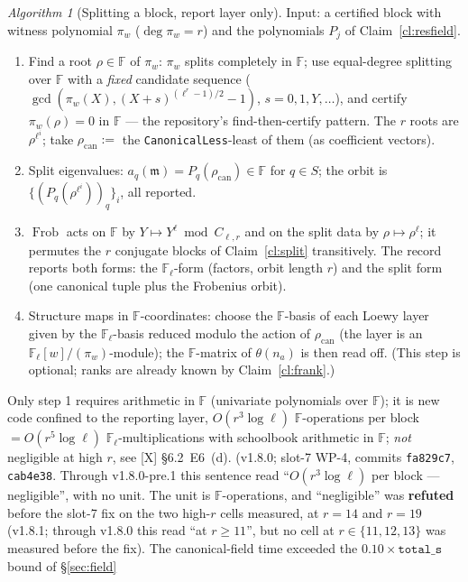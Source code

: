 \documentclass[11pt]{article}
\theoremstyle{remark}
\newtheorem{algorithm}[theorem]{Algorithm}
\newcommand{\F}{\mathbb{F}}
\newcommand{\Fl}{\F_\ell}
\DeclareMathOperator{\Frob}{Frob}
\newcommand{\m}{\mathfrak{m}}
\begin{document}
\begin{algorithm}[Splitting a block, report layer only]\label{alg:split}
Input: a certified block with witness polynomial $\pi_w$ ($\deg\pi_w=r$) and the polynomials
$P_j$ of Claim~\ref{cl:resfield}.
\begin{enumerate}
\item Find a root $\rho\in\F$ of $\pi_w$: $\pi_w$ splits completely in $\F$; use
  equal-degree splitting over $\F$ with a \emph{fixed} candidate sequence
  ($\gcd(\pi_w(X),(X+s)^{(\ell^r-1)/2}-1)$, $s=0,1,Y,\dots$), and certify $\pi_w(\rho)=0$ in $\F$
  --- the repository's find-then-certify pattern. The $r$ roots are $\rho^{\ell^i}$; take
  $\rho_{\mathrm{can}}:=$ the \texttt{CanonicalLess}-least of them (as coefficient vectors).
\item Split eigenvalues: $a_q(\m)=P_q(\rho_{\mathrm{can}})\in\F$ for $q\in S$; the orbit is
  $\{(P_q(\rho^{\ell^i}))_q\}_i$, all reported.
\item $\Frob$ acts on $\F$ by $Y\mapsto Y^\ell\bmod C_{\ell,r}$ and on the split data by
  $\rho\mapsto\rho^\ell$; it permutes the $r$ conjugate blocks of Claim~\ref{cl:split}
  transitively. The record reports both forms: the $\Fl$-form (factors, orbit length $r$) and
  the split form (one canonical tuple plus the Frobenius orbit).
\item Structure maps in $\F$-coordinates: choose the $\F$-basis of each Loewy layer given by
  the $\Fl$-basis reduced modulo the action of $\rho_{\mathrm{can}}$ (the layer is an
  $\Fl[w]/(\pi_w)$-module); the $\F$-matrix of $\theta(n_a)$ is then read off. (This step is
  optional; ranks are already known by Claim~\ref{cl:frank}.)
\end{enumerate}
\end{algorithm}
Only step 1 requires arithmetic in $\F$ (univariate polynomials over $\F$); it is new code
confined to the reporting layer, $O(r^3\log\ell)$ $\F$-operations per block $=O(r^5\log\ell)$
$\Fl$-multiplications with schoolbook arithmetic in $\F$; \emph{not} negligible at high $r$, see
[X] \S6.2~E6~(d). (v1.8.0; slot-7 WP-4, commits \texttt{fa829c7}, \texttt{cab4e38}. Through
v1.8.0-pre.1 this sentence read ``$O(r^3\log\ell)$ per block --- negligible'', with no unit. The
unit is $\F$-operations, and ``negligible'' was \textbf{refuted} before the slot-7 fix on the two
high-$r$ cells measured, at $r=14$ and $r=19$ (v1.8.1; through v1.8.0 this read ``at $r\ge11$'',
but no cell at $r\in\{11,12,13\}$ was measured before the fix). The canonical-field time exceeded
the $0.10\times\texttt{total\_s}$ bound of \S\ref{sec:field}
\end{document}
